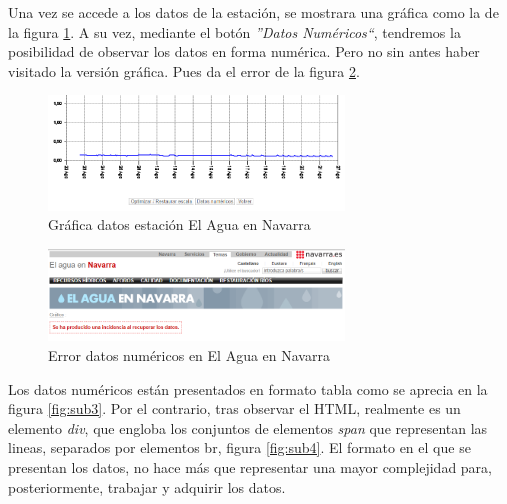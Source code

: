 Una vez se accede a los datos de la estación, se mostrara una gráfica como la de la figura \ref{fig:ej25}. A su vez, mediante el botón \textit{''Datos Numéricos``}, tendremos la posibilidad de observar los datos en forma numérica. Pero no sin antes haber visitado la versión gráfica. Pues da el error de la figura \ref{fig:ej5}.

\begin{figure} [H]
	\centering
	\includegraphics[width=0.7\textwidth]{fig/AguaEnNavarraGrafica.png}
	\caption[Gráfica de datos en estación de El Agua en Navarra]{Gráfica datos estación El Agua en Navarra}
	\label{fig:ej25}
\end{figure}

\begin{figure} [H]
	\centering
	\includegraphics[width=0.7\textwidth]{fig/ErrorAguaEnNavarra.png}
	\caption[Error al cargar directamente la página de datos numéricos en El Agua en Navarra]{Error datos numéricos en El Agua en Navarra}
	\label{fig:ej5}
\end{figure}

Los datos numéricos están presentados en formato tabla como se aprecia en la figura \ref{fig:sub3}. Por el contrario, tras observar el HTML, realmente es un elemento \textit{div}, que engloba los conjuntos de elementos \textit{span} que representan las lineas, separados por elementos br, figura \ref{fig:sub4}. El formato en el que se presentan los datos, no hace más que representar una mayor complejidad para, posteriormente, trabajar y adquirir los datos. 

